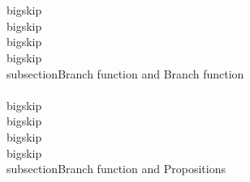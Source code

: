 \\[, m \\Op, \\Blb{if(i \\Pe j)}{,}{,} \\Rq , \\Blb{if(i \\Pe j)}{, m \\Op,}{, m \\Op,}\\]


\\bigskip
\\bigskip
\\bigskip
\\bigskip
\\subsection{Branch function and Branch function}
\\[, \\Bb{if(i \\Pe j)}{,\\Bb{if(m \\Pe n)}{,\\Tc c_1,}{,\\Tc c_2,},}{,\\Bb{if(m \\Pe n)}{,\\Tc c_3,}{,\\Tc c_4,},}, \\Rq , \\Bb{if(m \\Pe n)}{,\\Bb{if(i \\Pe j)}{,\\Tc c_1,}{,\\Tc c_3,},}{,\\Bb{if(i \\Pe j)}{,\\Tc c_2,}{,\\Tc c_4,},},\\]


\\bigskip
\\bigskip
\\bigskip
\\bigskip
\\subsection{Branch function and Propositions}
\\[,m \\Pe n, \\Bb{if(i \\Pe j)}{,\\Tc c_1,}{,\\Tc c_2,}, \\Rq , \\Bb{if(i \\Pe j)}{,m \\Pe n,\\Tc c_1,}{,m \\Pe n,\\Tc c_2,},\\]

